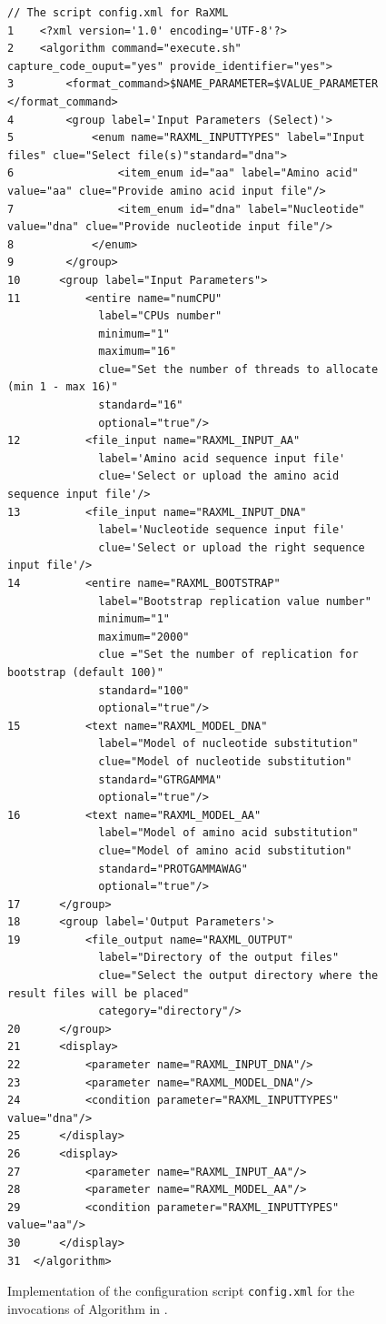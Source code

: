  \begin{figure}[!t]
 \begin{lstlisting}[style=myScalastyle]
 // The script config.xml for RaXML
1    <?xml version='1.0' encoding='UTF-8'?>
2    <algorithm command="execute.sh" capture_code_ouput="yes" provide_identifier="yes">
3        <format_command>$NAME_PARAMETER=$VALUE_PARAMETER </format_command>
4        <group label='Input Parameters (Select)'>
5            <enum name="RAXML_INPUTTYPES" label="Input files" clue="Select file(s)"standard="dna">
6                <item_enum id="aa" label="Amino acid" value="aa" clue="Provide amino acid input file"/>
7                <item_enum id="dna" label="Nucleotide" value="dna" clue="Provide nucleotide input file"/>
8            </enum>
9        </group>
10      <group label="Input Parameters">
11          <entire name="numCPU"
              label="CPUs number"
              minimum="1"
              maximum="16"
              clue="Set the number of threads to allocate (min 1 - max 16)"
              standard="16"
              optional="true"/>
12          <file_input name="RAXML_INPUT_AA"
              label='Amino acid sequence input file'
              clue='Select or upload the amino acid sequence input file'/>
13          <file_input name="RAXML_INPUT_DNA"
              label='Nucleotide sequence input file'
              clue='Select or upload the right sequence input file'/>
14          <entire name="RAXML_BOOTSTRAP"
              label="Bootstrap replication value number"
              minimum="1" 
              maximum="2000"
              clue ="Set the number of replication for bootstrap (default 100)"
              standard="100"
              optional="true"/>
15          <text name="RAXML_MODEL_DNA"
              label="Model of nucleotide substitution"
              clue="Model of nucleotide substitution"
              standard="GTRGAMMA"
              optional="true"/>
16          <text name="RAXML_MODEL_AA"
              label="Model of amino acid substitution"
              clue="Model of amino acid substitution"
              standard="PROTGAMMAWAG"
              optional="true"/>
17      </group>
18      <group label='Output Parameters'>
19          <file_output name="RAXML_OUTPUT" 
              label="Directory of the output files" 
              clue="Select the output directory where the result files will be placed" 
              category="directory"/>
20      </group>
21      <display>
22          <parameter name="RAXML_INPUT_DNA"/>
23          <parameter name="RAXML_MODEL_DNA"/>
24          <condition parameter="RAXML_INPUTTYPES" value="dna"/>
25      </display>
26      <display>
27          <parameter name="RAXML_INPUT_AA"/>
28          <parameter name="RAXML_MODEL_AA"/>
29          <condition parameter="RAXML_INPUTTYPES" value="aa"/>
30      </display>
31  </algorithm>
\end{lstlisting}
\vspace{-10px}
\caption{Implementation of the configuration script \texttt{config.xml} for the invocations of Algorithm \raxml in \system.}
\label{fig:configxmlcoderaxml}
\end{figure}

